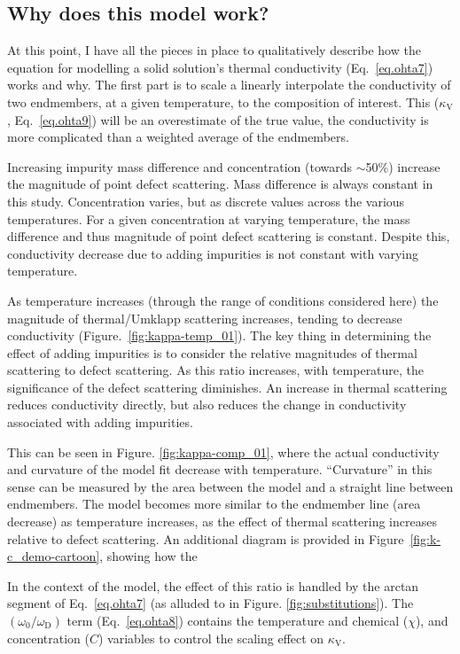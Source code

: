 \subsection{Why does this model work?}


At this point, I have all the pieces in place to qualitatively describe how the equation for modelling a solid solution's thermal conductivity (Eq.~\ref{eq.ohta7}) works and why. The first part is to scale a linearly interpolate the conductivity of two endmembers, at a given temperature, to the composition of interest. This ($\kappa_{\mathrm{V}}$, Eq.~\ref{eq.ohta9}) will be an overestimate of the true value, the conductivity is more complicated than a weighted average of the endmembers. 

Increasing impurity mass difference and concentration (towards $\sim$50\%) increase the magnitude of point defect scattering. Mass difference is always constant in this study. Concentration varies, but as discrete values across the various temperatures. For a given concentration at varying temperature, the mass difference and thus magnitude of point defect scattering is constant. Despite this, conductivity decrease due to adding impurities is not constant with varying temperature.

As temperature increases (through the range of conditions considered here) the magnitude of thermal/Umklapp scattering increases, tending to decrease conductivity (Figure.~\ref{fig:kappa-temp_01}). The key thing in determining the effect of adding impurities is to consider the relative magnitudes of thermal scattering to defect scattering. As this ratio increases, with temperature, the significance of the defect scattering diminishes. An increase in thermal scattering reduces conductivity directly, but also reduces the change in conductivity associated with adding impurities.

This can be seen in Figure. \ref{fig:kappa-comp_01}, where the actual conductivity and curvature of the model fit decrease with temperature. ``Curvature'' in this sense can be measured by the area between the model and a straight line between endmembers. The model becomes more similar to the endmember line (area decrease) as temperature increases, as the effect of thermal scattering increases relative to defect scattering. An additional diagram is provided in Figure~\ref{fig:k-c_demo-cartoon}, showing how the

In the context of the model, the effect of this ratio is handled by the arctan segment of Eq.~\ref{eq.ohta7} (as alluded to in Figure. \ref{fig:substitutions}). The $(\omega_{\mathrm{0}}/\omega_{\mathrm{D}})$ term (Eq.~\ref{eq.ohta8}) contains the temperature and chemical ($\chi$), and concentration ($C$) variables to control the scaling effect on $\kappa_{\mathrm{V}}$.

